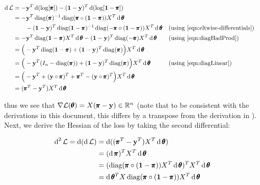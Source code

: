\begin{align}
  \operatorname{\text{d}} \mathcal{L} &= -\mathbf{y}^T \operatorname{\text{d}}(\log[\pmb{\pi}]) - (\mathbf{1} - \mathbf{y})^T \operatorname{\text{d}}(\log[\mathbf{1} - \pmb{\pi}]) \\
                  &= -\mathbf{y}^T \operatorname{diag}(\pmb{\pi})^{-1}\operatorname{diag}(\pmb{\pi} \circ ( \mathbf{1} - \pmb{\pi}))X^T \operatorname{\text{d}} \pmb{\theta} \nonumber \\
                  & \quad \quad - (\mathbf{1} - \mathbf{y})^T \operatorname{diag}(\mathbf{1} - \pmb{\pi})^{-1}\operatorname{diag}(-\pmb{\pi} \circ ( \mathbf{1} - \pmb{\pi})) X^T \operatorname{\text{d}} \pmb{\theta} && \text{(using \ref{eqn:eltwise-differentials})} \\
                  &= -\mathbf{y}^T \operatorname{diag}(\mathbf{1} - \pmb{\pi})X^T \operatorname{\text{d}} \pmb{\theta} - (\mathbf{1} - \mathbf{y})^T \operatorname{diag}(-\pmb{\pi}) X^T \operatorname{\text{d}} \pmb{\theta} && \text{(using \ref{eqn:diagHadProd})}\\                  
                  &= \Big(-\mathbf{y}^T \operatorname{diag}(\mathbf{1} - \pmb{\pi}) + (\mathbf{1} - \mathbf{y})^T \operatorname{diag}(\pmb{\pi})\Big) X^T \operatorname{\text{d}} \pmb{\theta}\\                                    
                  &= \Big(-\mathbf{y}^T (I_n - \operatorname{diag}(\pmb{\pi})) + (\mathbf{1} - \mathbf{y})^T \operatorname{diag}(\pmb{\pi})\Big) X^T \operatorname{\text{d}} \pmb{\theta} && \text{(using \ref{eqn:diagLinear})}\\                                                      
                  &= \Big(-\mathbf{y}^T + (\mathbf{y} \circ \pmb{\pi})^T + \pmb{\pi}^T - (\mathbf{y} \circ \pmb{\pi})^T \Big) X^T \operatorname{\text{d}} \pmb{\theta}\\                                                                                          
                  &= ( \pmb{\pi}^T -\mathbf{y}^T) X^T \operatorname{\text{d}} \pmb{\theta}\\                                                                                                            
\end{align}

thus we see that $\nabla \mathcal{L}(\pmb{\theta}) = X ( \pmb{\pi} - \mathbf{y}) \in \mathbb{R}^n$ (note that to be consistent with the derivations in this document, this differs by a transpose from the derivation in \citep{defreitas}).  Next, we derive the Hessian of the loss by taking the second differential:

\begin{align}
  \operatorname{\text{d}}^2 \mathcal{L} = \operatorname{\text{d}} (\operatorname{\text{d}} \mathcal{L}) &= \operatorname{\text{d}}(( \pmb{\pi}^T -\mathbf{y}^T) X^T \operatorname{\text{d}} \pmb{\theta})\\   
  &= (\operatorname{\text{d}} \pmb{\pi})^T X^T \operatorname{\text{d}} \pmb{\theta}\\                                                                                                            
  &= (\operatorname{diag}(\pmb{\pi}\circ (\mathbf{1} - \pmb{\pi}))X^T \operatorname{\text{d}} \pmb{\theta})^T X^T \operatorname{\text{d}} \pmb{\theta}\\                                                                               
  &= \operatorname{\text{d}} \pmb{\theta}^T X \operatorname{diag}(\pmb{\pi}\circ (\mathbf{1} - \pmb{\pi})) X^T \operatorname{\text{d}} \pmb{\theta}\\                                                                                                                                         
\end{align}

